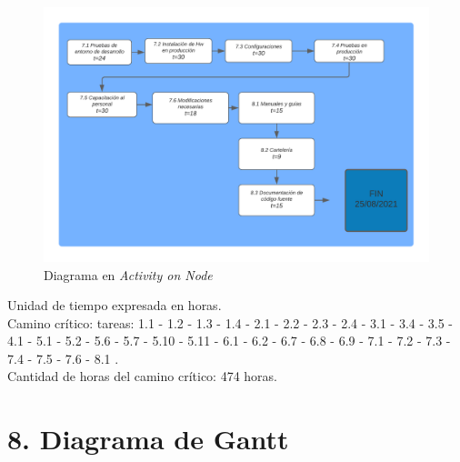 \documentclass[11pt]{charter}
\begin{document}
\begin{figure}[htpb]
\centering 
\includegraphics[width=.9\textwidth]{./Figuras/AON-4.png}
\caption{Diagrama en \textit{Activity on Node}}
\label{fig:AoN}
\end{figure}

Unidad de tiempo expresada en horas.
\\Camino crítico: tareas: 1.1 - 1.2 - 1.3 - 1.4 - 2.1 - 2.2 - 2.3 - 2.4 - 3.1 - 3.4 - 3.5 - 4.1 - 5.1 - 5.2 - 5.6 - 5.7 - 5.10 - 5.11 - 6.1 - 6.2 - 6.7 - 6.8 - 6.9 - 7.1 - 7.2 - 7.3 - 7.4 - 7.5 - 7.6 - 8.1 .
\\Cantidad de horas del camino crítico: 474 horas.


\section{8. Diagrama de Gantt}
\label{sec:gantt}
\end{document}
